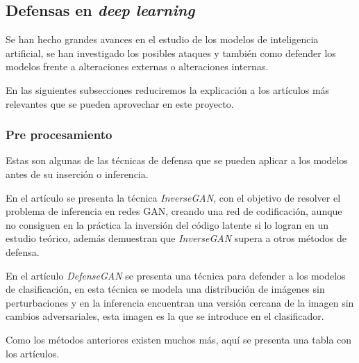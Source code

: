\subsection{Defensas en \textit{deep learning}}
\label{sec:defense}

Se han hecho grandes avances en el estudio de los modelos de inteligencia artificial, se han investigado los posibles ataques y también como defender los modelos frente a alteraciones externas o alteraciones internas.

En las siguientes subsecciones reduciremos la explicación a los artículos más relevantes que se pueden aprovechar en este proyecto.

\subsubsection{Pre procesamiento}

Estas son algunas de las técnicas de defensa que se pueden aplicar a los modelos antes de su inserción o inferencia.


En el artículo \cite{lin2019invertdefendmodelbasedapproximate} se presenta la técnica \textit{InverseGAN}, con el objetivo de resolver el problema de inferencia en redes \gls{GAN}, creando una red de codificación, aunque no consiguen en la práctica la inversión del código latente si lo logran en un estudio teórico, además demuestran que \textit{InverseGAN} supera a otros métodos de defensa.

En el artículo \textit{DefenseGAN} \cite{samangouei2018defenseganprotectingclassifiersadversarial} se presenta una técnica para defender a los modelos de clasificación, en esta técnica se modela una distribución de imágenes sin perturbaciones y en la inferencia encuentran una versión cercana de la imagen sin cambios adversariales, esta imagen es la que se introduce en el clasificador.

Como los métodos anteriores existen muchos más, aquí se presenta una tabla con los artículos.

